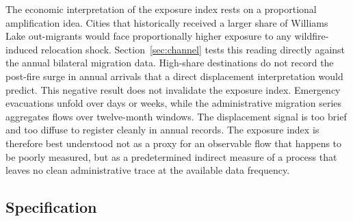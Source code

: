 \documentclass[12pt]{article}
\begin{document}
The economic interpretation of the exposure index rests on a proportional
amplification idea. Cities that historically received a larger share of Williams
Lake out-migrants would face proportionally higher exposure to any wildfire-induced
relocation shock. Section~\ref{sec:channel} tests this reading directly
against the annual bilateral migration data. High-share destinations do not
record the post-fire surge in annual arrivals that a direct displacement
interpretation would predict. This negative result does
not invalidate the exposure index. Emergency evacuations unfold over days or weeks,
while the administrative migration series aggregates flows over twelve-month
windows. The displacement signal is too brief and too diffuse to register cleanly
in annual records. The exposure index is therefore best understood not as a proxy
for an observable flow that happens to be poorly measured, but as a predetermined
indirect measure of a process that leaves no clean administrative trace at the
available data frequency.

\subsection{Specification}
\end{document}
